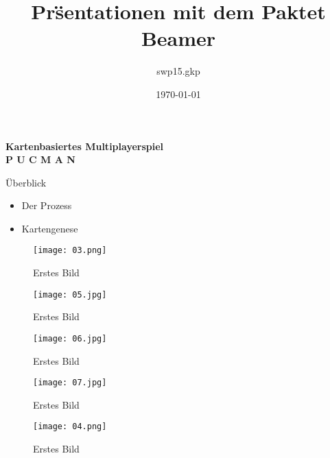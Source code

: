 \documentclass{beamer}
\title[SWT-Praktikum]{Pr\"sentationen mit dem Paktet  Beamer}
\author{swp15.gkp}
\date{\today{}}
\begin{document}
\begin{frame}
\center \huge \textbf{Kartenbasiertes Multiplayerspiel} \\
\center \huge \textbf{P U C M A N}
\end{frame}

\begin{frame}{Überblick}
\begin{itemize}
\item Der Prozess
\item Kartengenese
\end{itemize}
\end{frame}

\begin{frame}
\begin{figure}[htbp] 
  \centering
     \texttt{[image: 03.png]}
  \caption{Erstes Bild}
  \label{fig:Bild1}
\end{figure}

\end{frame}

\begin{frame}
\begin{figure}[htbp] 
  \centering
     \texttt{[image: 05.jpg]}
  \caption{Erstes Bild}
  \label{fig:Bild1}
\end{figure}

\end{frame}

\begin{frame}
\begin{figure}[htbp] 
  \centering
     \texttt{[image: 06.jpg]}
  \caption{Erstes Bild}
  \label{fig:Bild1}
\end{figure}

\end{frame}
\begin{frame}
\begin{figure}[htbp] 
  \centering
     \texttt{[image: 07.jpg]}
  \caption{Erstes Bild}
  \label{fig:Bild1}
\end{figure}

\end{frame}

\begin{frame}
\begin{figure}[htbp] 
  \centering
     \texttt{[image: 04.png]}
  \caption{Erstes Bild}
  \label{fig:Bild1}
\end{figure}

\end{frame}
\end{document}
